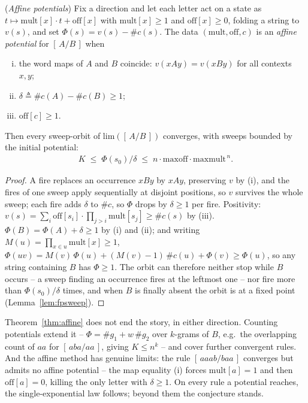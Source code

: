\documentclass[runningheads,envcountsect]{llncs}
\begin{document}
\begin{theorem}
    (\emph{Affine potentials})
    \label{thm:affine}
    Fix a direction and let each letter act on a state as
    $t \mapsto \mathrm{mult}[x]\cdot t + \mathrm{off}[x]$ with
    $\mathrm{mult}[x] \ge 1$ and $\mathrm{off}[x] \ge 0$, folding a
    string to $v(s)$, and set $\Phi(s) = v(s) - \#c(s)$.  The data
    $(\mathrm{mult}, \mathrm{off}, c)$ is an \emph{affine potential} for
    $[\,A/B\,]$ when
    \begin{enumerate}[(i)]
        \item the word maps of $A$ and $B$ coincide: $v(xAy) = v(xBy)$
        for all contexts $x, y$;
        \item $\delta \triangleq \#c(A) - \#c(B) \ge 1$;
        \item $\mathrm{off}[c] \ge 1$.
    \end{enumerate}
    Then every sweep-orbit of $\mathrm{lim}([\,A/B\,])$ converges, with
    sweeps bounded by the initial potential:
    \begin{align}
        K \;\le\; \Phi(s_0)/\delta \;\le\; n\cdot\mathrm{maxoff}\cdot
        \mathrm{maxmult}^{\,n}.
    \end{align}
\end{theorem}

\begin{proof}
    A fire replaces an occurrence $xBy$ by $xAy$, preserving $v$ by (i),
    and the fires of one sweep apply sequentially at disjoint positions,
    so $v$ survives the whole sweep; each fire adds $\delta$ to $\#c$, so
    $\Phi$ drops by $\delta \ge 1$ per fire.  Positivity:
    $v(s) = \sum_i \mathrm{off}[s_i]\cdot\prod_{j>i}\mathrm{mult}[s_j]
    \ge \#c(s)$ by (iii).  $\Phi(B) = \Phi(A) + \delta \ge 1$ by (i) and
    (ii); and writing $M(u) = \prod_{x \in u}\mathrm{mult}[x] \ge 1$,
    $\Phi(uv) = M(v)\,\Phi(u) + (M(v){-}1)\,\#c(u) + \Phi(v) \ge
    \Phi(u)$, so any string containing $B$ has $\Phi \ge 1$.  The orbit
    can therefore neither stop while $B$ occurs -- a sweep finding an
    occurrence fires at the leftmost one -- nor fire more than
    $\Phi(s_0)/\delta$ times, and when $B$ is finally absent the orbit is
    at a fixed point (Lemma~\ref{lem:fpsweep}).
\end{proof}

Theorem~\ref{thm:affine} does not end the story, in either direction.
Counting potentials extend it -- $\Phi = \#g_1 + w\,\#g_2$ over
$k$-grams of $B$, e.g.\ the overlapping count of $aa$ for
$[\,aba/aa\,]$, giving $K \le n^{k}$ -- and cover further convergent
rules. And the affine method has genuine limits: the rule
$[\,aaab/baa\,]$ converges but admits no affine potential -- the map
equality (i) forces $\mathrm{mult}[a] = 1$ and then $\mathrm{off}[a] =
0$, killing the only letter with $\delta \ge 1$. On every rule a
potential reaches, the single-exponential law follows; beyond them the
conjecture stands.
\end{document}
